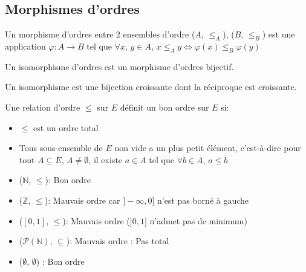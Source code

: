 \subsection{Morphismes d'ordres}

\begin{definition}

	Un morphisme d'ordres entre 2 ensembles d'ordre ($A$, $\leqslant_A$), ($B$, $\leqslant_B$) est une application $\varphi : A \to B$
	tel que $\forall x$, $y\in A$, $x \leqslant_A y \iff \varphi(x) \leqslant_B \varphi(y)$

\end{definition}

\begin{definition}
	Un isomorphisme d'ordres est un morphisme d'ordres bijectif.
\end{definition}

\begin{remarque}
	Un isomorphisme est une bijection croissante dont la réciproque est croissante.
\end{remarque}

\begin{definition}

	Une relation d'ordre $\leqslant$ sur $E$ définit un bon ordre sur $E$ si:
	\begin{itemize}
		\item $\leqslant$ est un ordre total
		\item Tous sous-ensemble de $E$ non vide a un plus petit élément, c'est-à-dire pour tout $A \subseteq E$, $A \neq \emptyset$, il existe
		      $a \in A$ tel que $\forall b \in A$, $a \leqslant b$
	\end{itemize}

\end{definition}

\begin{example}
	\begin{itemize}
		\item ($\mathbb{N}$, $\leqslant$): Bon ordre
		\item ($\mathbb{Z}$, $\leqslant$): Mauvais ordre car $]-\infty, 0]$ n'est pas borné à gauche
		\item ($[0, 1]$, $\leqslant$): Mauvais ordre ($]0, 1]$ n'admet pas de minimum)
		\item ($\mathscr{P}(\mathbb{N})$, $\subseteq$): Mauvais ordre : Pas total
		\item ($\emptyset$, $\emptyset$) : Bon ordre
	\end{itemize}
\end{example}

